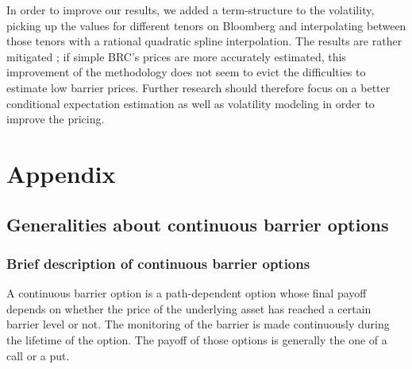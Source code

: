 \documentclass[a4paper,11pt,english]{book}
\let\cleardoublepage\clearpage
\begin{document}
In order to improve our results, we added a term-structure to the volatility, picking up the values for different tenors on Bloomberg and interpolating between those tenors with a rational quadratic spline interpolation. The results are rather mitigated ; if simple BRC's prices are more accurately estimated, this improvement of the methodology does not seem to evict the difficulties to estimate low barrier prices. Further research should therefore focus on a better conditional expectation estimation as well as volatility modeling in order to improve the pricing.




\newpage
\nocite{*}






\newpage
\begingroup
\let\clearpage\relax
\let\cleardoublepage\relax


\renewcommand{\thesection}{\Alph{section}}
\chapter*{Appendix}
\appendix
{}

\section{Generalities about continuous barrier options}
\label{appendix:down-in-put}

\subsection{Brief description of continuous barrier options}
A continuous barrier option is a path-dependent option whose final payoff depends on whether the price of the underlying asset has reached a certain barrier level or not. The monitoring of the barrier is made continuously during the lifetime of the option. The payoff of those options is generally the one of a call or a put.\\
\end{document}
